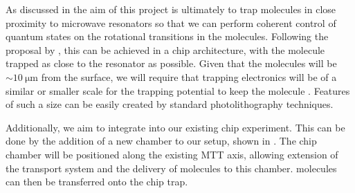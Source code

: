 As discussed in  the aim of this project is ultimately to
trap molecules in close proximity to microwave resonators so that we can
perform coherent control of quantum states on the rotational transitions in the
molecules.
%
Following the proposal by , this can be achieved in a chip
architecture, with the molecule trapped as close to the resonator as possible.
%
%
Given that the molecules will be $\sim\SI{10}{\micro\meter}$ from the surface,
we will require that trapping electronics will be of a similar or smaller
scale for the trapping potential to keep the molecule .
Features of such a size can be easily created by standard photolithography
techniques.

Additionally, we aim to integrate into our existing chip experiment. This can
be done by the addition of a new chamber to our setup, shown in
. The chip chamber will be positioned along
the existing MTT axis, allowing extension of the transport system and the
delivery of molecules to this chamber. \CaF{} molecules can then be transferred
onto the chip trap.

